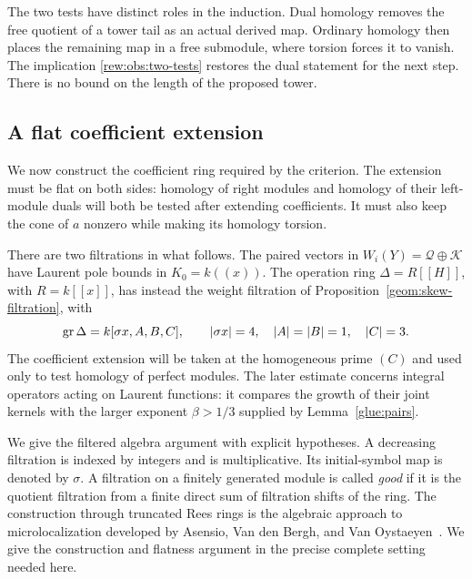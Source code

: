The two tests have distinct roles in the induction.  Dual homology
removes the free quotient of a tower tail as an actual derived map.
Ordinary homology then places the remaining map in a free submodule,
where torsion forces it to vanish.  The implication
\eqref{rew:obs:two-tests} restores the dual statement for the next
step.  There is no bound on the length of the proposed tower.

\subsection{A flat coefficient extension}

We now construct the coefficient ring required by the criterion.
The extension must be flat on both sides: homology of right
modules and homology of their left-module duals will both be tested
after extending coefficients.  It must also keep the cone of $a$
nonzero while making its homology torsion.

There are two filtrations in what follows.  The paired vectors in
$W_i(Y)=\mathcal Q\oplus\mathcal K$ have Laurent pole bounds in
$K_0=k((x))$.  The operation ring $\Delta=R[[H]]$, with $R=k[[x]]$,
has instead the weight filtration of
Proposition~\ref{geom:skew-filtration}, with
\[
 \operatorname{gr}\Delta=k[\sigma x,A,B,C],\qquad
 |\sigma x|=4,\quad |A|=|B|=1,\quad |C|=3.
\]
The coefficient extension will be taken at the homogeneous prime
$(C)$ and used only to test homology of perfect modules.  The later
estimate concerns integral operators acting on
Laurent functions: it compares the growth of their joint kernels
with the larger exponent $\beta>1/3$ supplied by
Lemma~\ref{glue:pairs}.

We give the filtered algebra argument with explicit hypotheses.  A
decreasing filtration is indexed by integers and is multiplicative.  Its
initial-symbol map is denoted by $\sigma$.  A filtration on a finitely
generated module is called \emph{good} if it is the quotient filtration
from a finite direct sum of filtration shifts of the ring.
The construction through truncated Rees rings is the algebraic approach
to microlocalization developed by Asensio, Van den Bergh, and
Van Oystaeyen~\cite[Sections~2--3]{AVVO1989}.  We give the construction
and flatness argument in the precise complete setting needed here.


